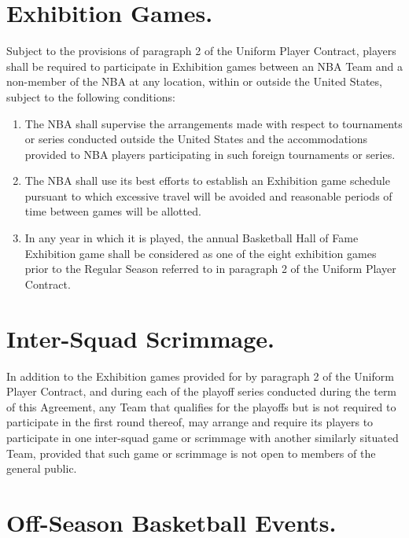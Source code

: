 \documentclass[
]{book}
\providecommand{\tightlist}{%
  \setlength{\itemsep}{0pt}\setlength{\parskip}{0pt}}
\begin{document}

\hypertarget{exhibition-games.}{%
\section{Exhibition Games.}\label{exhibition-games.}}

Subject to the provisions of paragraph 2 of the Uniform Player Contract, players shall be required to participate in Exhibition games between an NBA Team and a non-member of the NBA at any location, within or outside the United States, subject to the following conditions:

\begin{enumerate}
\def\labelenumi{(\alph{enumi})}
\tightlist
\item
  The NBA shall supervise the arrangements made with respect to tournaments or series conducted outside the United States and the accommodations provided to NBA players participating in such foreign tournaments or series.
\item
  The NBA shall use its best efforts to establish an Exhibition game schedule pursuant to which excessive travel will be avoided and reasonable periods of time between games will be allotted.
\item
  In any year in which it is played, the annual Basketball Hall of Fame Exhibition game shall be considered as one of the eight exhibition games prior to the Regular Season referred to in paragraph 2 of the Uniform Player Contract.
\end{enumerate}

\hypertarget{inter-squad-scrimmage.}{%
\section{Inter-Squad Scrimmage.}\label{inter-squad-scrimmage.}}

In addition to the Exhibition games provided for by paragraph 2 of the Uniform Player Contract, and during each of the playoff series conducted during the term of this Agreement, any Team that qualifies for the playoffs but is not required to participate in the first round thereof, may arrange and require its players to participate in one inter-squad game or scrimmage with another similarly situated Team, provided that such game or scrimmage is not open to members of the general public.

\hypertarget{off-season-basketball-events.}{%
\section{Off-Season Basketball Events.}\label{off-season-basketball-events.}}
\end{document}
